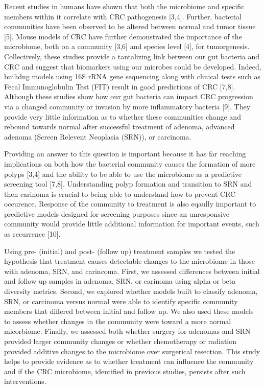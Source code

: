 \documentclass[12pt,]{article}
\begin{document}
Recent studies in humans have shown that both the microbiome and
specific members within it correlate with CRC pathogenesis {[}3,4{]}.
Further, bacterial communities have been observed to be altered between
normal and tumor tissue {[}5{]}. Mouse models of CRC have further
demonstrated the importance of the microbiome, both on a community
{[}3,6{]} and species level {[}4{]}, for tumorgenesis. Collectively,
these studies provide a tantalizing link between our gut bacteria and
CRC and suggest that biomarkers using our microbes could be developed.
Indeed, builidng models using 16S rRNA gene sequencing along with
clinical tests such as Fecal Immunoglobulin Test (FIT) result in good
predictions of CRC {[}7,8{]}. Although these studies show how our gut
bacteria can impact CRC progression via a changed community or invasion
by more inflammatory bacteria {[}9{]}. They provide very little
information as to whether these communities change and rebound towards
normal after successful treatment of adenoma, advanced adenoma (Screen
Relevent Neoplasia (SRN)), or carcinoma.

Providing an answer to this question is important because it has far
reaching implications on both how the bacterial community causes the
formation of more polyps {[}3,4{]} and the ability to be able to use the
microbiome as a predictive screening tool {[}7,8{]}. Understanding polyp
formation and transition to SRN and then carinoma is crucial to being
able to understand how to prevent CRC occurence. Response of the
community to treatment is also eqaully important to predictive models
designed for screening purposes since an unresponsive community would
provide little additional information for important events, such as
recurrence {[}10{]}.

Using pre- (initial) and post- (follow up) treatment samples we tested
the hypothesis that treatment causes detectable changes to the
microbiome in those with adenoma, SRN, and carincoma. First, we assessed
differences between initial and follow up samples in adenoma, SRN, or
carinoma using alpha or beta diversity metrics. Second, we explored
whether models built to classify adenoma, SRN, or carcinoma versus
normal were able to identify specific community members that differed
between initial and follow up. We also used these models to assess
whether changes in the community were toward a more normal micorbiome.
Finally, we assessed both whether surgery for adenomas and SRN provided
larger community changes or whether chemotherapy or radiation provided
additive changes to the microbiome over surgerical resection. This study
helps to provide evidence as to whether treatment can influence the
community and if the CRC microbiome, identified in previous studies,
persists after such interventions.
\end{document}
